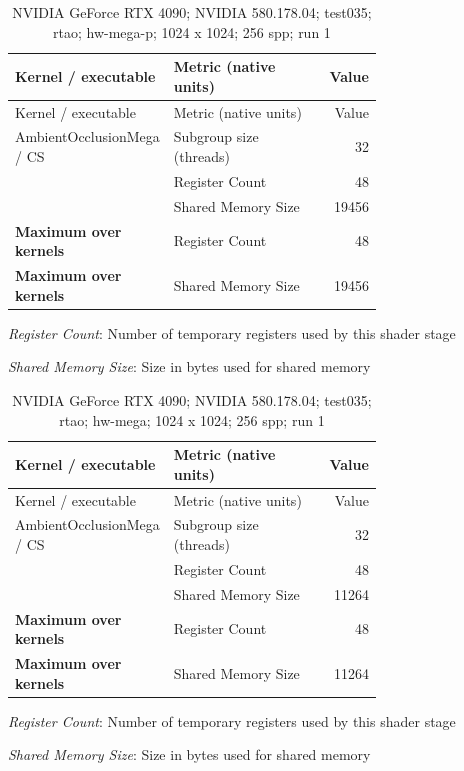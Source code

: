 \begin{longtable}{p{0.30\linewidth}p{0.43\linewidth}r}
\caption{NVIDIA GeForce RTX 4090; NVIDIA 580.178.04; test035; rtao; hw-mega-p; 1024 x 1024; 256 spp; run 1}\label{tab:hydra-profile-15}\\
\hline Kernel / executable & Metric (native units) & Value \\\hline
\endfirsthead
\hline Kernel / executable & Metric (native units) & Value \\\hline
\endhead
AmbientOcclusionMega / CS & Subgroup size (threads) & 32 \\
 & Register Count & 48 \\
 & Shared Memory Size & 19456 \\
\hline
\textbf{Maximum over kernels} & Register Count & 48 \\
\textbf{Maximum over kernels} & Shared Memory Size & 19456 \\
\hline
\end{longtable}
\noindent\textit{Register Count}: Number of temporary registers used by this shader stage\par
\noindent\textit{Shared Memory Size}: Size in bytes used for shared memory\par
\begin{longtable}{p{0.30\linewidth}p{0.43\linewidth}r}
\caption{NVIDIA GeForce RTX 4090; NVIDIA 580.178.04; test035; rtao; hw-mega; 1024 x 1024; 256 spp; run 1}\label{tab:hydra-profile-16}\\
\hline Kernel / executable & Metric (native units) & Value \\\hline
\endfirsthead
\hline Kernel / executable & Metric (native units) & Value \\\hline
\endhead
AmbientOcclusionMega / CS & Subgroup size (threads) & 32 \\
 & Register Count & 48 \\
 & Shared Memory Size & 11264 \\
\hline
\textbf{Maximum over kernels} & Register Count & 48 \\
\textbf{Maximum over kernels} & Shared Memory Size & 11264 \\
\hline
\end{longtable}
\noindent\textit{Register Count}: Number of temporary registers used by this shader stage\par
\noindent\textit{Shared Memory Size}: Size in bytes used for shared memory\par

